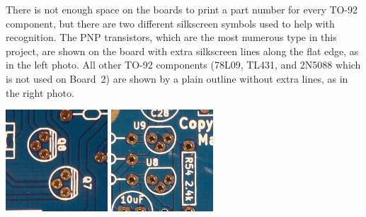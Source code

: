 There is not enough space on the boards to print a part number for every
TO-92 component, but there are two different silkscreen symbols used to help
with recognition.  The PNP transistors, which are the most numerous type
in this project, are shown on the board with extra silkscreen lines along
the flat edge, as in the left photo.  All other TO-92 components (78L09,
TL431, and 2N5088 which is not used on Board~2) are shown by a plain outline
without extra lines, as in the right photo.

\noindent\includegraphics[width={1.50in}]{to92-bar.jpg}\quad
\includegraphics[width={1.50in}]{to92-nobar.jpg}

